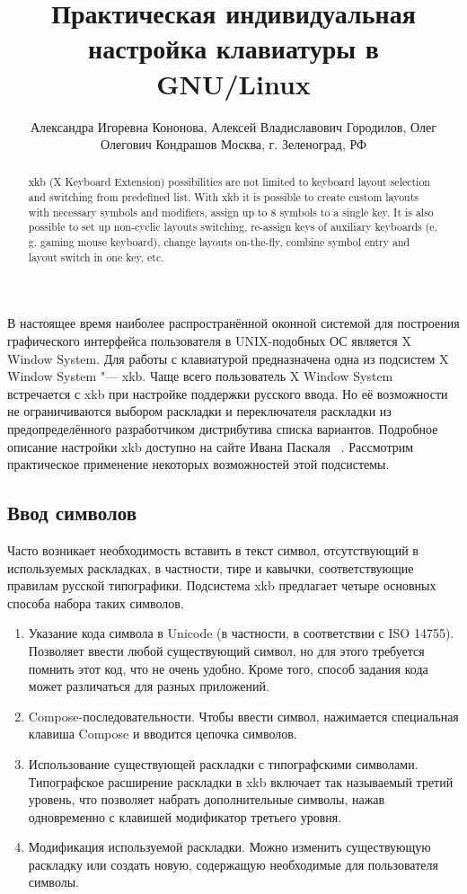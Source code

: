 \documentclass[10pt, a5paper]{article}
\begin{document}
\title{Практическая индивидуальная настройка клавиатуры в GNU/Linux}
\author{Александра Игоревна Кононова, Алексей Владиславович Городилов, Олег Олегович Кондрашов Москва, г. Зеленоград, РФ}
\maketitle
\begin{abstract}
xkb (X Keyboard Extension) possibilities are not limited to keyboard layout selection and switching from predefined list.
With xkb it is possible to create custom layouts with necessary symbols and modifiers, assign up to 8 symbols to a single key. It is also possible to set up non-cyclic layouts switching, re-assign keys of auxiliary keyboards (e. g. gaming mouse keyboard), change layouts on-the-fly, combine symbol entry and layout switch in one key, etc.
\end{abstract}

В настоящее время наиболее распространённой оконной системой для построения графического интерфейса пользователя в UNIX-подобных ОС является X Window System. Для работы с клавиатурой предназначена одна из подсистем X Window System "--- xkb. 
Чаще всего пользователь X Window System встречается с xkb при настройке поддержки русского ввода. Но её возможности не ограничиваются выбором раскладки и переключателя раскладки из предопределённого разработчиком дистрибутива списка вариантов. Подробное описание настройки xkb доступно на сайте Ивана Паскаля ~\cite{Kononova1}. Рассмотрим практическое применение некоторых возможностей этой подсистемы.

\subsection*{Ввод символов}

Часто возникает необходимость вставить в текст символ, отсутствующий в используемых раскладках, в частности, тире и кавычки, соответствующие правилам русской типографики. Подсистема xkb предлагает четыре основных способа набора таких символов.

\begin{enumerate}
  \item Указание кода символа в Unicode (в частности, в соответствии с ISO 14755).
Позволяет ввести любой существующий символ, но для этого требуется помнить этот код, что не очень удобно. Кроме того, способ задания кода может различаться для разных приложений.
  \item Compose-последовательности.
Чтобы ввести символ, нажимается специальная клавиша Compose и вводится цепочка символов.
  \item Использование существующей раскладки с типографскими \linebreak символами.
Типографское расширение раскладки в xkb включает так называемый третий уровень, что позволяет набрать дополнительные символы, нажав одновременно с клавишей модификатор третьего уровня.
  \item Модификация используемой раскладки.
Можно изменить существующую раскладку или создать новую, содержащую необходимые для пользователя символы.
\end{enumerate}
\end{document}
